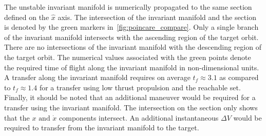 \documentclass[letterpaper, paper,11pt]{AAS}		%
\begin{document}
The unstable invariant manifold is numerically propagated to the same \Poincare section defined on the \( \hat{x} \) axis.
The intersection of the invariant manifold and the \Poincare section is denoted by the green markers in~\cref{fig:poincare_compare}.
Only a single branch of the invariant manifold intersects with the ascending region of the target orbit.
There are no intersections of the invariant manifold with the descending region of the target orbit.
The numerical values associated with the green points denote the required time of flight along the invariant manifold in non-dimensional units.
A transfer along the invariant manifold requires on average \( t_f \approx 3.1 \) as compared to \( t_f \approx 1.4 \) for a transfer using low thrust propulsion and the reachable set.
Finally, it should be noted that an additional maneuver would be required for a transfer using the invariant manifold.
The intersection on the \Poincare section only shows that the \( x \text{ and } \dot{x} \) components intersect.
An additional instantaneous \( \Delta V \) would be required to transfer from the invariant manifold to the target.
\end{document}
